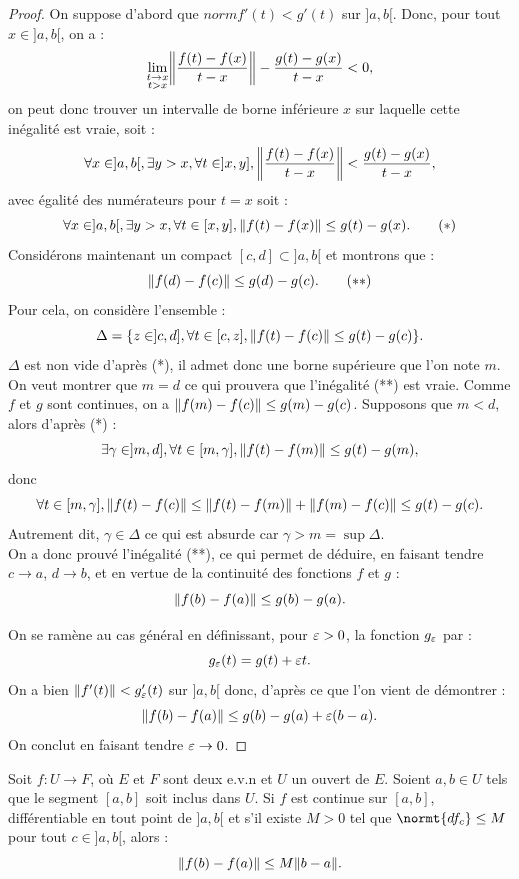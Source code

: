 \begin{proof}
On suppose d'abord que $norm{f'(t)} < g'(t)$ sur $]a,b[$. Donc, pour tout $x \in ]a,b[$, on a :
\[ \lim_{\substack{t \to x \\ t > x}} \norm*{\dfrac{f(t)-f(x)}{t-x}} - \dfrac{g(t)-g(x)}{t-x} < 0 , \]
on peut donc trouver un intervalle de borne inférieure $x$ sur laquelle cette inégalité est vraie, soit :
\[ \forall x \in ]a,b[, \exists y > x, \forall t \in ]x, y], \norm*{\dfrac{f(t)-f(x)}{t-x}} < \dfrac{g(t)-g(x)}{t-x} , \]
avec égalité des numérateurs pour $t=x$ soit :
\[ \forall x \in ]a,b[, \exists y > x, \forall t \in [x, y], \norm*{f(t)-f(x)} \leq g(t)-g(x) . \qquad (*) \]
Considérons maintenant un compact $[c,d] \subset ]a,b[$ et montrons que :
\[ \norm{f(d)-f(c)} \leq g(d)-g(c) . \qquad (**) \]
Pour cela, on considère l'ensemble :
\[ \Delta = \set{ z \in ]c,d], \forall t \in [c, z], \norm{f(t)-f(c)} \leq g(t) - g(c) } . \]
$\Delta$ est non vide d'après (*), il admet donc une borne supérieure que l'on note $m$. 
On veut montrer que $m=d$ ce qui prouvera que l'inégalité (**) est vraie.
Comme $f$ et $g$ sont continues, on a $\norm{f(m)-f(c)} \leq g(m) - g(c)$. 
Supposons que $m < d$, alors d'après (*) :
\[ \exists \gamma \in ]m, d], \forall t \in [m, \gamma], \norm{f(t)-f(m)} \leq g(t) - g(m) , \]
donc 
\[ \forall t \in [m, \gamma], \norm{f(t)-f(c)} \leq \norm{f(t)-f(m)} + \norm{f(m)-f(c)} \leq g(t) - g(c) . \]
Autrement dit, $\gamma \in \Delta$ ce qui est absurde car $\gamma > m = \sup{\Delta}$. \\
On a donc prouvé l'inégalité (**), ce qui permet de déduire, en faisant tendre $c \to a$, $d \to b$, et
en vertue de la continuité des fonctions $f$ et $g$ :
\[ \norm{f(b)-f(a)}\leq g(b) - g(a) . \]

On se ramène au cas général en définissant, pour $\veps >0$, la fonction $g_{\veps}$ par :
\[ g_{\veps}(t) = g(t) + \veps t . \]
On a bien $\norm{f'(t)} < g_{\veps}'(t)$ sur $]a,b[$ donc, d'après ce que l'on vient de démontrer :
\[ \norm{f(b)-f(a)}\leq g(b) - g(a) + \veps (b-a) . \]
On conclut en faisant tendre $\veps \to 0$.
\end{proof}

\begin{thm}[cas $E \to F$]
Soit $f:U \to F$, où $E$ et $F$ sont deux e.v.n et $U$ un ouvert de $E$. 
Soient $a,b \in U$ tels que le segment $[a,b]$ soit inclus dans $U$. 
Si $f$ est continue sur $[a,b]$, différentiable en tout point de $]a,b[$ et s'il existe $M>0$ tel que $\normt{df_c} \leq M$ pour tout 
$c \in ]a,b[$, alors :
\[ \norm{f(b)-f(a)} \leq M \norm{b-a} . \]
\end{thm}

